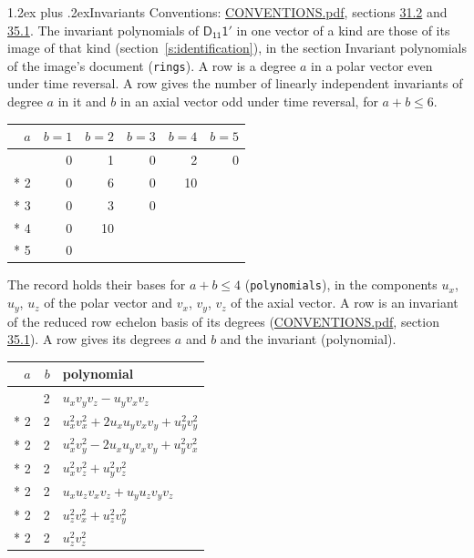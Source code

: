 \documentclass[10pt,a4paper]{article}
\makeatletter
\renewcommand\section{\@startsection{section}{1}{\z@}{-3ex plus -1ex minus -.2ex}%
  {1.2ex plus .2ex}{\normalfont\large\sffamily\bfseries\color{parttitle}}}
\numberwithin{equation}{section}
\newcommand{\grp}[1]{\mathsf{#1}}
\makeatother
\begin{document}
\section{Invariants}\label{s:invariants}
Conventions: \href{../../CONVENTIONS.pdf}{CONVENTIONS.pdf}, sections \href{../../CONVENTIONS.pdf\#conv.31.2}{31.2} and \href{../../CONVENTIONS.pdf\#conv.35.1}{35.1}.
The invariant polynomials of $\grp{D_{11}1'}$ in one vector of a kind are those of its image of that kind (section~\ref{s:identification}), in the section Invariant polynomials of the image's document (\texttt{rings}).
\leavevmode\label{n:index.degree.polar}\label{n:index.degree.axial}A row is a degree $a$ in a polar vector even under time reversal. A row gives the number of linearly independent invariants of degree $a$ in it and $b$ in an axial vector odd under time reversal, for $a + b \le 6$.
{\small\begin{longtable}{@{}rrrrrr@{}}\toprule
$a$ & $b = 1$ & $b = 2$ & $b = 3$ & $b = 4$ & $b = 5$\\\midrule\endhead
\bottomrule\endfoot\endlastfoot
1 & 0 & 1 & 0 & 2 & 0\\*
2 & 0 & 6 & 0 & 10 & \\*
3 & 0 & 3 & 0 &  & \\*
4 & 0 & 10 &  &  & \\*
5 & 0 &  &  &  & \\
\bottomrule\end{longtable}}
\leavevmode\label{n:local.component.polar}\label{n:local.component.axial}The record holds their bases for $a + b \le 4$ (\texttt{polynomials}), in the components $u_{x}$, $u_{y}$, $u_{z}$ of the polar vector and $v_{x}$, $v_{y}$, $v_{z}$ of the axial vector. \label{n:head.polynomial}A row is an invariant of the reduced row echelon basis of its degrees (\href{../../CONVENTIONS.pdf}{CONVENTIONS.pdf}, section \href{../../CONVENTIONS.pdf\#conv.35.1}{35.1}). A row gives its degrees $a$ and $b$ and the invariant (polynomial).
{\small\renewcommand{\arraystretch}{1.2}\begin{longtable}{@{}rrl@{}}\toprule
$a$ & $b$ & polynomial\\\midrule\endhead
\bottomrule\endfoot\endlastfoot
1 & 2 & $u_{x}v_{y}v_{z} - u_{y}v_{x}v_{z}$\\*
2 & 2 & $u_{x}^{2}v_{x}^{2} + 2u_{x}u_{y}v_{x}v_{y} + u_{y}^{2}v_{y}^{2}$\\*
2 & 2 & $u_{x}^{2}v_{y}^{2} - 2u_{x}u_{y}v_{x}v_{y} + u_{y}^{2}v_{x}^{2}$\\*
2 & 2 & $u_{x}^{2}v_{z}^{2} + u_{y}^{2}v_{z}^{2}$\\*
2 & 2 & $u_{x}u_{z}v_{x}v_{z} + u_{y}u_{z}v_{y}v_{z}$\\*
2 & 2 & $u_{z}^{2}v_{x}^{2} + u_{z}^{2}v_{y}^{2}$\\*
2 & 2 & $u_{z}^{2}v_{z}^{2}$\\
\bottomrule\end{longtable}}
\end{document}

